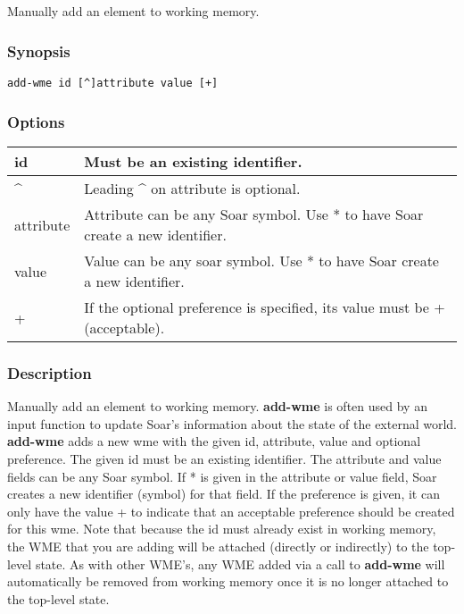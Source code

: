 \subsection{}
\label{add-wme}
Manually add an element to working memory. 
\subsubsection*{Synopsis}
  \begin{verbatim}
add-wme id [^]attribute value [+]
\end{verbatim}
\subsubsection*{Options}
\begin{tabular}{|l|l|}
\hline 
 id  & Must be an existing identifier.  \\
 \hline 
 \^{}  & Leading \^{} on attribute is optional.  \\
 \hline 
 attribute  & Attribute can be any Soar symbol. Use * to have Soar create a new identifier.  \\
 \hline 
 value  & Value can be any soar symbol. Use * to have Soar create a new identifier.  \\
 \hline 
 +  & If the optional preference is specified, its value must be + (acceptable).  \\
 \hline 
\end{tabular}
\subsubsection*{Description}
 Manually add an element to working memory. \textbf{add-wme}
 is often used by an input function to update Soar's information about the state of the external world. 
 \textbf{add-wme}
 adds a new wme with the given id, attribute, value and optional preference. The given id must be an existing identifier. The attribute and value fields can be any Soar symbol. If * is given in the attribute or value field, Soar creates a new identifier (symbol) for that field. If the preference is given, it can only have the value + to indicate that an acceptable preference should be created for this wme. 
 Note that because the id must already exist in working memory, the WME that you are adding will be attached (directly or indirectly) to the top-level state. As with other WME's, any WME added via a call to \textbf{add-wme}
 will automatically be removed from working memory once it is no longer attached to the top-level state. 
